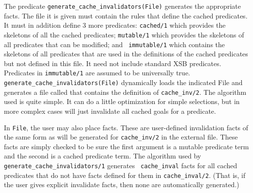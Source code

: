 The predicate {\tt generate\_cache\_invalidators(File)} generates the
appropriate  facts.  The file it is given must
contain the rules that define the cached predicates. It must in
addition define 3 more predicates: {\tt cached/1} which provides the
skeletons of all the cached predicates; {\tt mutable/1} which provides
the skeletons of all predicates that can be modified; and {\tt
immutable/1} which contains the skeletons of all predicates that are
used in the definitions of the cached predicates but not defined in
this file.  It need not include standard XSB predicates.  Predicates
in {\tt immutable/1} are assumed to be universally true.  {\tt
generate\_cache\_invalidators(File)} dynamically loads the indicated
File and generates a file called  that
contains the definition of {\tt cache\_inv/2}.  The algorithm used is
quite simple.  It can do a little optimization for simple selections,
but in more complex cases will just invalidate all cached goals for a
predicate.

In {\tt File}, the user may also place  facts.
These are user-defined invalidation facts of the same form as will be
generated for {\tt cache\_inv/2} in the external file.  These facts
are simply checked to be sure the first argument is a mutable
predicate term and the second is a cached predicate term.  The
algorithm used by {\tt generate\_cache\_invalidators/1} generates {\tt
cache\_inval} facts for all cached predicates that do not have facts
defined for them in {\tt cache\_inval/2}.  (That is, if the user gives
explicit invalidate facts, then none are automatically generated.)


